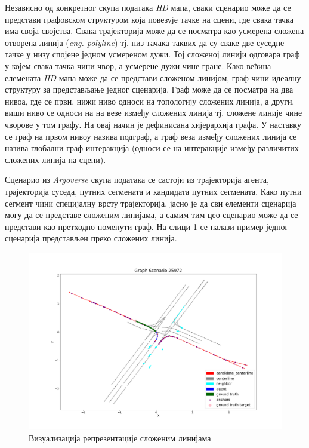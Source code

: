 \documentclass[11pt,oneside]{memoir}
\begin{document}
Независно од конкретног скупа података \textit{HD} мапа, сваки сценарио може да се представи графовском структуром која повезује тачке на сцени, где
свака тачка има своја својства. Свака трајекторија може да се посматра као усмерена сложена отворена линија (\textit{eng. polyline}) тј.
низ тачака таквих да су сваке две суседне тачке у низу спојене једном усмереном дужи. Тој сложеној линији одговара граф у којем свака тачка
чини чвор, а усмерене дужи чине гране. Како већина елемената \textit{HD} мапа може да се представи сложеном линијом, граф чини идеалну структуру
за представљање једног сценарија. Граф може да се посматра на два нивоа, где се први, нижи ниво односи на топологију сложених линија, а други, виши ниво 
се односи на на везе између сложених линија тј. сложене линије чине чворове у том графу. На овај начин је дефинисана хијерархија графа. 
У наставку се граф на првом нивоу назива подграф, а граф веза између сложених линија се назива глобални граф интеракција (односи се на интеракције
између различитих сложених линија на сцени).

Сценарио из \textit{Argoverse} скупа података се састоји из трајекторија агента, трајекторија суседа, путних сегмената и кандидата путних сегмената.
Како путни сегмент чини специјалну врсту трајекторија, јасно је да сви елементи сценарија могу да се представе сложеним линијама, а самим тим
цео сценарио може да се представи као претходно поменути граф. На слици \ref{polylines-representation} се налази пример једног сценарија
представљен преко сложених линија.

\begin{figure}[H]
  \includegraphics[width=1.0\textwidth]{images/polylines-representation.png}
  \caption{Визуализација репрезентације сложеним линијама}
  \label{polylines-representation}
\end{figure}
\end{document}
